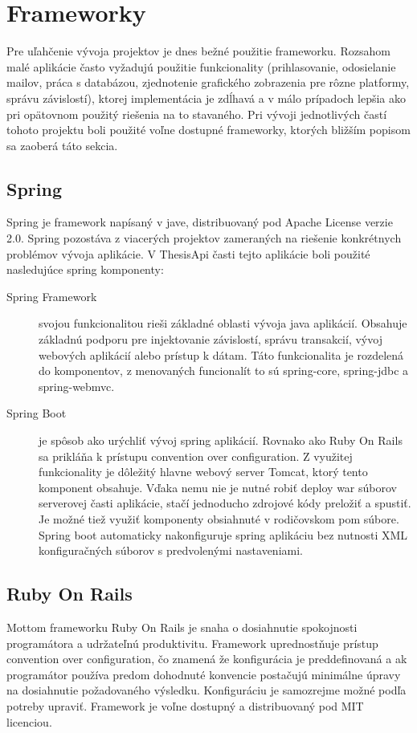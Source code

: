 	
\section{Frameworky}
	Pre uľahčenie vývoja projektov je dnes bežné použitie frameworku. Rozsahom malé aplikácie často vyžadujú použitie funkcionality (prihlasovanie, odosielanie mailov, práca s databázou, zjednotenie grafického zobrazenia pre rôzne platformy, správu závislostí), ktorej implementácia je zdĺhavá a v málo prípadoch lepšia ako pri opätovnom použitý riešenia na to stavaného. Pri vývoji jednotlivých častí tohoto projektu boli použité voľne dostupné frameworky, ktorých bližším popisom sa zaoberá táto sekcia.

	\subsection{Spring}
	Spring je framework napísaný v jave, distribuovaný pod Apache License verzie 2.0. Spring pozostáva z viacerých projektov zameraných na riešenie konkrétnych problémov vývoja aplikácie. V ThesisApi časti tejto aplikácie boli použité nasledujúce spring komponenty:
	\begin{description}
		\item[Spring Framework] svojou funkcionalitou rieši základné oblasti vývoja java aplikácií. Obsahuje základnú podporu pre injektovanie závislostí, správu transakcií, vývoj webových aplikácií alebo prístup k dátam. Táto funkcionalita je rozdelená do komponentov, z menovaných funcionalít to sú spring-core, spring-jdbc a spring-webmvc.
		
		\item[Spring Boot] je spôsob ako urýchliť vývoj spring aplikácií. Rovnako ako Ruby On Rails sa prikláňa k prístupu convention over configuration. Z využitej funkcionality je dôležitý hlavne webový server Tomcat, ktorý tento komponent obsahuje. Vďaka nemu nie je nutné robiť deploy war súborov serverovej časti aplikácie, stačí jednoducho zdrojové kódy preložiť a spustiť. Je možné tiež využiť komponenty obsiahnuté v rodičovskom pom súbore. Spring boot automaticky nakonfiguruje spring aplikáciu bez nutnosti XML konfiguračných súborov s predvolenými nastaveniami.
	\end{description}
		
	\subsection{Ruby On Rails}
	Mottom frameworku Ruby On Rails je snaha o dosiahnutie spokojnosti programátora a udržateľnú produktivitu. Framework uprednostňuje prístup convention over configuration, čo znamená že konfigurácia je preddefinovaná a ak programátor používa predom dohodnuté konvencie postačujú minimálne úpravy na dosiahnutie požadovaného výsledku. Konfiguráciu je samozrejme možné podľa potreby upraviť. Framework je voľne dostupný a distribuovaný pod MIT licenciou.
	
